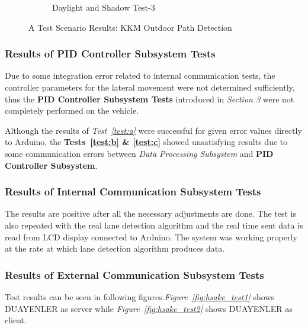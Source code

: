 \documentclass[a4paper,12pt]{article}
\begin{document}
\begin{figure}[H]
\begin{subfigure}{.31\textwidth}
\caption{\label{fig:dataP_outsideObs2} Daylight and Shadow Test-3}

\end{subfigure}

\caption{\label{fig:dataP_outside} A Test Scenario Results: KKM Outdoor Path Detection}

\end{figure}	



\subsubsection*{Results of PID Controller Subsystem Tests}


Due to some integration error related to internal communication tests, the controller parameters for the lateral movement were not determined sufficiently, thus the \textbf{PID Controller Subsystem Tests} introduced in \textit{Section 3} were not completely performed on the vehicle. 


Although the results of \textit{Test~\ref{test:a}} were successful for given error values directly to Arduino, the \textbf{Tests~\ref{test:b} \& \ref{test:c}} showed unsatisfying results due to some communication errors between \textit{Data Processing Subsystem} and \textbf{PID Controller Subsystem}.



\subsubsection*{Results of Internal Communication Subsystem Tests}


The results are positive after all the necessary adjustments are done. The test is also repeated with the real lane detection algorithm and the real time sent data is read from LCD display connected to Arduino. The system was working properly at the rate at which lane detection algorithm produces data.






\subsubsection*{Results of External Communication Subsystem Tests}



Test results can be seen in following figures.\textit{Figure~\ref{fig:hsake_test1}} shows DUAYENLER as server while \textit{Figure~\ref{fig:hsake_test2}} shows DUAYENLER as client.
\end{document}
